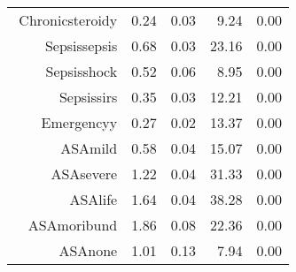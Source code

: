 \begin{tabular}{rrrrr}
$$  Chronic\-steroid\-y & 0.24 & 0.03 & 9.24 & 0.00 \\ 
  Sepsis\-sepsis & 0.68 & 0.03 & 23.16 & 0.00 \\ 
  Sepsis\-shock & 0.52 & 0.06 & 8.95 & 0.00 \\ 
  Sepsis\-sirs & 0.35 & 0.03 & 12.21 & 0.00 \\ 
  Emergency\-y & 0.27 & 0.02 & 13.37 & 0.00 \\ 
  ASA\-mild & 0.58 & 0.04 & 15.07 & 0.00 \\ 
  ASA\-severe & 1.22 & 0.04 & 31.33 & 0.00 \\ 
  ASA\-life & 1.64 & 0.04 & 38.28 & 0.00 \\ 
  ASA\-moribund & 1.86 & 0.08 & 22.36 & 0.00 \\ 
  ASA\-none & 1.01 & 0.13 & 7.94 & 0.00 \\ 
   \hline
\end{tabular}


